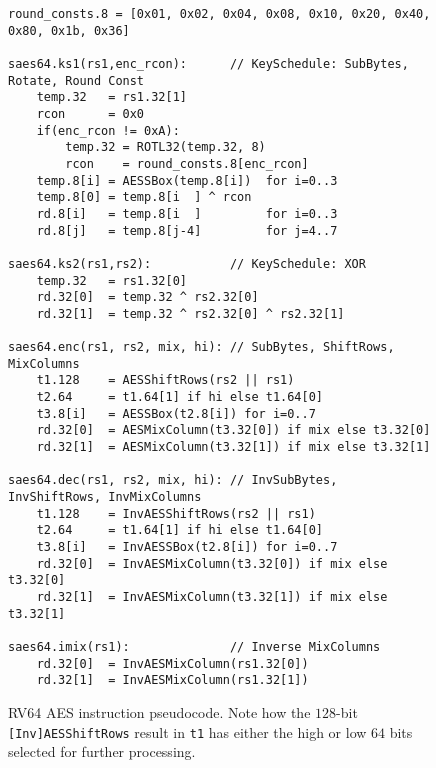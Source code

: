 \begin{figure}
\begin{lstlisting}[language=pseudo]
round_consts.8 = [0x01, 0x02, 0x04, 0x08, 0x10, 0x20, 0x40, 0x80, 0x1b, 0x36]

saes64.ks1(rs1,enc_rcon):      // KeySchedule: SubBytes, Rotate, Round Const
    temp.32   = rs1.32[1]
    rcon      = 0x0
    if(enc_rcon != 0xA):
        temp.32 = ROTL32(temp.32, 8)
        rcon    = round_consts.8[enc_rcon]
    temp.8[i] = AESSBox(temp.8[i])  for i=0..3
    temp.8[0] = temp.8[i  ] ^ rcon
    rd.8[i]   = temp.8[i  ]         for i=0..3
    rd.8[j]   = temp.8[j-4]         for j=4..7

saes64.ks2(rs1,rs2):           // KeySchedule: XOR
    temp.32   = rs1.32[0]
    rd.32[0]  = temp.32 ^ rs2.32[0]
    rd.32[1]  = temp.32 ^ rs2.32[0] ^ rs2.32[1]

saes64.enc(rs1, rs2, mix, hi): // SubBytes, ShiftRows, MixColumns
    t1.128    = AESShiftRows(rs2 || rs1)
    t2.64     = t1.64[1] if hi else t1.64[0]
    t3.8[i]   = AESSBox(t2.8[i]) for i=0..7
    rd.32[0]  = AESMixColumn(t3.32[0]) if mix else t3.32[0]
    rd.32[1]  = AESMixColumn(t3.32[1]) if mix else t3.32[1]

saes64.dec(rs1, rs2, mix, hi): // InvSubBytes, InvShiftRows, InvMixColumns
    t1.128    = InvAESShiftRows(rs2 || rs1)
    t2.64     = t1.64[1] if hi else t1.64[0]
    t3.8[i]   = InvAESSBox(t2.8[i]) for i=0..7
    rd.32[0]  = InvAESMixColumn(t3.32[0]) if mix else t3.32[0]
    rd.32[1]  = InvAESMixColumn(t3.32[1]) if mix else t3.32[1]

saes64.imix(rs1):              // Inverse MixColumns
    rd.32[0]  = InvAESMixColumn(rs1.32[0])
    rd.32[1]  = InvAESMixColumn(rs1.32[1])
\end{lstlisting}
\caption{
RV64 AES instruction pseudocode.
Note how the $128$-bit {\tt [Inv]AESShiftRows} result in {\tt t1} has
either the high or low $64$ bits selected for further processing.
}
\label{fig:pesudo:aes:rv64}
\end{figure}

